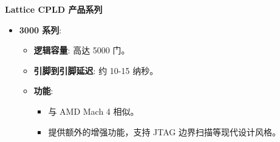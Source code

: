 \begin{frame}[allowframebreaks]{\textbf{Lattice CPLD 产品系列}}
\begin{itemize}
\begin{itemize}
    \begin{itemize}
    \tightlist
    \item
        宏单元与 I/O 引脚的比率更高。
    \item
        速度性能优于 1000 系列。
    \end{itemize}
    \item
    \textbf{引脚到引脚延迟}: 5.5 纳秒，提供业界领先的速度。
    \end{itemize}
\item
    \textbf{3000 系列}:

    \begin{itemize}
    \tightlist
    \item
    \textbf{逻辑容量}: 高达 5000 门。
    \item
    \textbf{引脚到引脚延迟}: 约 10-15 纳秒。
    \item
    \textbf{功能}:

    \begin{itemize}
    \tightlist
    \item
        与 AMD Mach 4 相似。
    \item
        提供额外的增强功能，支持 JTAG 边界扫描等现代设计风格。
    \end{itemize}
    \end{itemize}
\end{itemize}
\end{frame}

